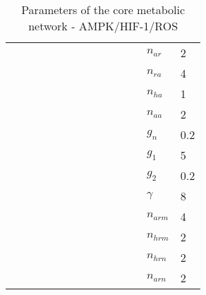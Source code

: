 \documentclass{article}
\begin{document}
\begin{table}[]
\begin{tabular}{ll|ll|ll|ll|ll|ll|ll}
                &       &               &               &               &               &               &       &               &       &               &               & $n_{ar}$      & 2     \\
                &       &               &               &               &               &               &       &               &       &               &               & $n_{ra}$      & 4     \\
                &       &               &               &               &               &               &       &               &       &               &               & $n_{ha}$      & 1     \\
                &       &               &               &               &               &               &       &               &       &               &               & $n_{aa}$      & 2     \\
                &       &               &               &               &               &               &       &               &       &               &               & $g_n$         & 0.2   \\
                &       &               &               &               &               &               &       &               &       &               &               & $g_1$         & 5     \\
                &       &               &               &               &               &               &       &               &       &               &               & $g_2$         & 0.2   \\
                &       &               &               &               &               &               &       &               &       &               &               & $\gamma$      & 8     \\
                &       &               &               &               &               &               &       &               &       &               &               & $n_{arm}$     & 4     \\
                &       &               &               &               &               &               &       &               &       &               &               & $n_{hrm}$     & 2     \\
                &       &               &               &               &               &               &       &               &       &               &               & $n_{hrn}$     & 2     \\
                &       &               &               &               &               &               &       &               &       &               &               & $n_{arn}$     & 2     \\

\end{tabular}
\caption{Parameters of the core metabolic network - AMPK/HIF-1/ROS}
\label{table:mparams}
\end{table}
\end{document}
